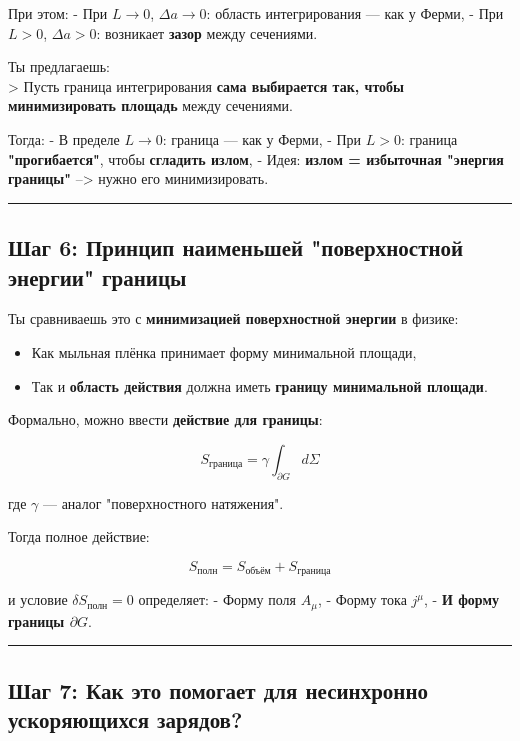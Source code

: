 \documentclass[11pt]{article}
\providecommand{\tightlist}{%
      \setlength{\itemsep}{0pt}\setlength{\parskip}{0pt}}
\begin{document}
При этом: - При \(L \to 0\), \(\Delta a \to 0\): область интегрирования
--- как у Ферми, - При \(L > 0\), \(\Delta a > 0\): возникает
\textbf{зазор} между сечениями.

Ты предлагаешь:\\
\textgreater{} Пусть граница интегрирования \textbf{сама выбирается так,
чтобы минимизировать площадь} между сечениями.

Тогда: - В пределе \(L \to 0\): граница --- как у Ферми, - При
\(L > 0\): граница \textbf{"прогибается"}, чтобы \textbf{сгладить
излом}, - Идея: \textbf{излом = избыточная "энергия границы"} --> нужно
его минимизировать.

\begin{center}\rule{0.5\linewidth}{\linethickness}\end{center}

\subsection{ Шаг 6: Принцип наименьшей "поверхностной энергии" границы}

Ты сравниваешь это с \textbf{минимизацией поверхностной энергии} в
физике:

\begin{itemize}
\tightlist
\item
  Как мыльная плёнка принимает форму минимальной площади,
\item
  Так и \textbf{область действия} должна иметь \textbf{границу
  минимальной площади}.
\end{itemize}

Формально, можно ввести \textbf{действие для границы}:

\[
S_{\text{граница}} = \gamma \int_{\partial G} d\Sigma
\]

где \(\gamma\) --- аналог "поверхностного натяжения".

Тогда полное действие:

\[
S_{\text{полн}} = S_{\text{объём}} + S_{\text{граница}}
\]

и условие \(\delta S_{\text{полн}} = 0\) определяет: - Форму поля
\(A_\mu\), - Форму тока \(j^\mu\), - \textbf{И форму границы
\(\partial G\)}.

\begin{center}\rule{0.5\linewidth}{\linethickness}\end{center}

\subsection{ Шаг 7: Как это помогает для несинхронно ускоряющихся зарядов?}
\end{document}
